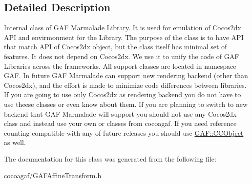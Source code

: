 \subsection{Detailed Description}
Internal class of G\-A\-F Marmalade Library. It is used for emulation of Cocos2dx A\-P\-I and envirmonment for the Library. The purpose of the class is to have A\-P\-I that match A\-P\-I of Cocos2dx object, but the class itself has minimal set of features. It does not depend on Cocos2dx. We use it to unify the code of G\-A\-F Libraries across the frameworks. All support classes are located in namespace G\-A\-F. In future G\-A\-F Marmalade can support new rendering backend (other than Cocos2dx), and the effort is made to minimize code differences between libraries. If you are going to use only Cocos2dx as rendering backend you do not have to use theese classes or even know about them. If you are planning to switch to new backend that G\-A\-F Marmalade will support you should not use any Cocos2dx class and instead use your own or classes from cocoagaf. If you need reference counting compatible with any of future releases you should use \hyperlink{class_g_a_f_1_1_c_c_object}{G\-A\-F\-::\-C\-C\-Object} as well. 

The documentation for this class was generated from the following file\-:\begin{DoxyCompactItemize}
\item 
cocoagaf/G\-A\-F\-Affine\-Transform.\-h\end{DoxyCompactItemize}
